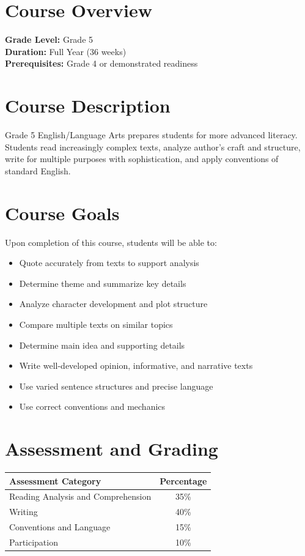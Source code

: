 \documentclass[11pt,letterpaper]{report}
\begin{document}
\section{Course Overview}

\textbf{Grade Level:} Grade 5\\
\textbf{Duration:} Full Year (36 weeks)\\
\textbf{Prerequisites:} Grade 4 or demonstrated readiness

\section{Course Description}

Grade 5 English/Language Arts prepares students for more advanced literacy. Students read increasingly complex texts, analyze author's craft and structure, write for multiple purposes with sophistication, and apply conventions of standard English.

\section{Course Goals}

Upon completion of this course, students will be able to:

\begin{itemize}
    \item Quote accurately from texts to support analysis
    \item Determine theme and summarize key details
    \item Analyze character development and plot structure
    \item Compare multiple texts on similar topics
    \item Determine main idea and supporting details
    \item Write well-developed opinion, informative, and narrative texts
    \item Use varied sentence structures and precise language
    \item Use correct conventions and mechanics
\end{itemize}

\section{Assessment and Grading}

\begin{center}
\begin{tabular}{|l|c|}
\hline
\textbf{Assessment Category} & \textbf{Percentage} \\
\hline
Reading Analysis and Comprehension & 35\% \\
\hline
Writing & 40\% \\
\hline
Conventions and Language & 15\% \\
\hline
Participation & 10\% \\
\hline
\end{tabular}
\end{center}
\end{document}
